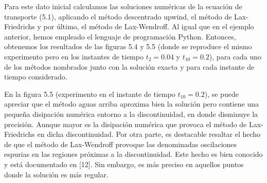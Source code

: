 Para este dato inicial calculamos las soluciones numéricas de la
ecuación de transporte (5.1), aplicando el método descentrado upwind,
el método de Lax-Friedrichs y por último, el método de Lax-Wendroff.
Al igual que en el ejemplo anterior, hemos empleado el lenguaje de
programación Python.
Entonces, obtenemos los resultados de las ﬁguras 5.4 y 5.5 (donde se
reproduce el mismo experimento pero en los instantes de tiempo
$t_{2}=0.04$ y $t_{10}=0.2$), para cada uno de los métodos nombrados
junto con la solución exacta y para cada instante de tiempo
considerado.

En la figura 5.5 (experimento en el instante de tiempo $t_10=0.2$),
se puede apreciar que el método aguas arriba aproxima bien la
solución pero contiene una pequeña disipación numérica entorno a la
discontinuidad, en donde disminuye la precisión.
Aunque mayor es la disipación numérica que provoca el método de
Lax-Friedrichs en dicha discontinuidad.
Por otra parte, es destacable resaltar el hecho de que el método de
Lax-Wendroff provoque las denominadas oscilaciones espurias en las
regiones próximas a la discontinuidad.
Este hecho es bien conocido y está documentado en [12].
Sin embargo, es más preciso en aquellos puntos donde la solución es
más regular.